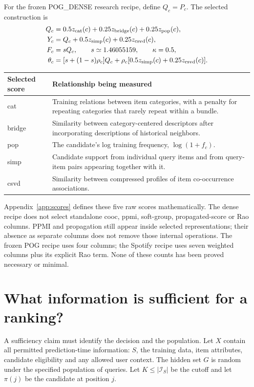 \documentclass[11pt,a4paper]{article}
\begin{document}
For the frozen POG\_DENSE research recipe, define $Q_c=P_c$. The selected
construction is
\begin{align}
 Q_c&=0.5z_{\rm cat}(c)+0.25z_{\rm bridge}(c)+0.25z_{\rm pop}(c),\notag\\
 Y_c&=Q_c+0.5z_{\rm simp}(c)+0.25z_{\rm csvd}(c),\notag\\
 F_c&=sQ_c,\qquad s\simeq1.46055159,\qquad \kappa=0.5,\notag\\
 \theta_c&=[s+(1-s)\rho_c]Q_c
       +\rho_c[0.5z_{\rm simp}(c)+0.25z_{\rm csvd}(c)].
 \label{eq:dense}
\end{align}

\begin{center}
\begin{tabularx}{\linewidth}{@{}lY@{}}
\toprule
Selected score & Relationship being measured\\
\midrule
cat & Training relations between item categories, with a penalty for repeating categories that rarely repeat within a bundle.\\
bridge & Similarity between category-centered descriptors after incorporating descriptions of historical neighbors.\\
pop & The candidate's log training frequency, $\log(1+f_c)$.\\
simp & Candidate support from individual query items and from query-item pairs appearing together with it.\\
csvd & Similarity between compressed profiles of item co-occurrence associations.\\
\bottomrule
\end{tabularx}
\end{center}

Appendix~\ref{app:scores} defines these five raw scores mathematically.
The dense recipe does not select standalone cooc, ppmi, soft-group,
propagated-score or Rao columns. PPMI and propagation still appear inside
selected representations; their absence as separate columns does not remove
those internal operations. The frozen POG recipe uses four columns; the
Spotify recipe uses seven weighted columns plus its explicit Rao term.
None of these counts has been proved necessary or minimal.

\section{What information is sufficient for a ranking?}
\label{sec:ranking}

A sufficiency claim must identify the decision and the population. Let $X$
contain all permitted prediction-time information: $S$, the training data,
item attributes, candidate eligibility and any allowed user context. The
hidden set $G$ is random under the specified population of queries. Let
$K\leq|\mathcal I_S|$ be the cutoff and let $\pi(j)$ be the candidate at
position $j$.
\end{document}
